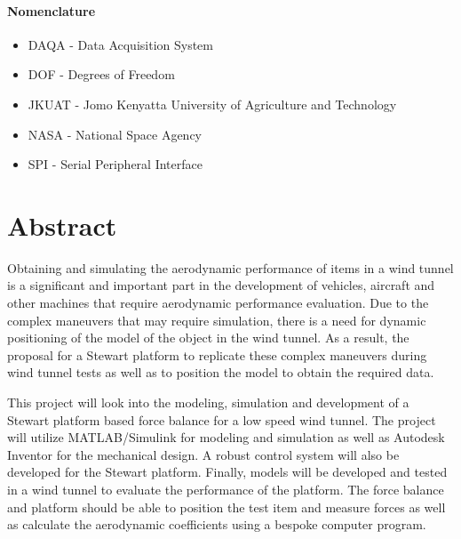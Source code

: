 \paragraph{Nomenclature}
\begin{itemize}
\item DAQA - Data Acquisition System
\item DOF - Degrees of Freedom
\item JKUAT - Jomo Kenyatta University of Agriculture and Technology
\item NASA - National Space Agency
\item SPI - Serial Peripheral Interface
\end{itemize}
\pagebreak
{}

\section*{Abstract}
\label{sec:Abstract}
Obtaining and simulating the aerodynamic performance of items in a wind tunnel is a
significant and important part in the development of vehicles, aircraft and other machines
that require aerodynamic performance evaluation. Due to the complex maneuvers that may require simulation, there is a need for dynamic positioning of the model of the object in the wind tunnel. As a result, the proposal for a Stewart platform to replicate these complex maneuvers during wind tunnel tests as well as to position the model to obtain the required data.

This project will look into the modeling, simulation and development of a Stewart
platform based force balance for a low speed wind tunnel. The project will utilize
MATLAB/Simulink for modeling and simulation as well as Autodesk Inventor for the mechanical
design. A robust control system will also be developed for the Stewart platform.
Finally, models will be developed and tested in a wind tunnel to evaluate the performance
of the platform. The force balance and platform should be able to position the test
item and measure forces as well as calculate the aerodynamic coefficients using a bespoke computer program.




